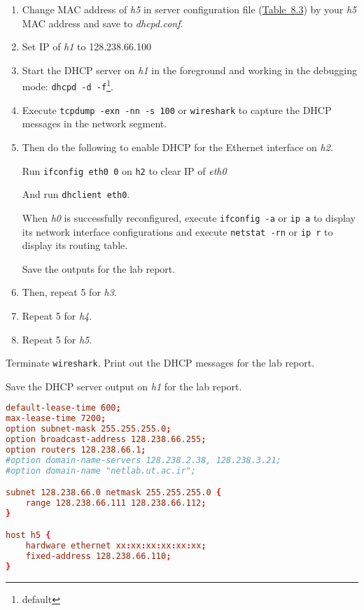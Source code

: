 \documentclass{../UTNetLab}
\begin{document}
    \begin{enumerate}
        \item Change MAC address of \textit{h5} in server configuration file (\hyperref[tab:8.3]{Table~8.3}) by your \textit{h5} MAC address and save to \textit{dhcpd.conf}.
        
        \item Set IP of \textit{h1} to {128.238.66.100}
        
        \item Start the DHCP server on \textit{h1} in the foreground and working in the debugging mode: \lstinline{dhcpd -d -f}\footnote{default }.
        
        \item Execute \lstinline{tcpdump -exn -nn -s 100} or \lstinline{wireshark} to capture the DHCP messages in the network segment.
        
        \item Then do the following to enable DHCP for the Ethernet interface on \textit{h2}.

        Run \lstinline{ifconfig eth0 0} on \lstinline{h2} to clear IP of \textit{eth0}

        And run \lstinline{dhclient eth0}.

        When \textit{h0} is successfully reconfigured, execute \lstinline{ifconfig -a} or \lstinline{ip a} to display its
        network interface configurations and execute \lstinline{netstat -rn} or \lstinline{ip r} to display its routing table.

        Save the outputs for the lab report.
        
        \item Then, repeat 5 for \textit{h3}.
        
        \item Repeat 5 for \textit{h4}.
        
        \item Repeat 5 for \textit{h5}.
    \end{enumerate}

    Terminate \lstinline{wireshark}.
    Print out the DHCP messages for the lab report.

    Save the DHCP server output on \textit{h1} for the lab report.

    \begin{lstlisting}[language={conf}, caption={A DHCP server configuration file (Table~8.3)\label{tab:8.3}},emph={xx}]
default-lease-time 600;
max-lease-time 7200;
option subnet-mask 255.255.255.0;
option broadcast-address 128.238.66.255;
option routers 128.238.66.1;
#option domain-name-servers 128.238.2.38, 128.238.3.21;
#option domain-name "netlab.ut.ac.ir";

subnet 128.238.66.0 netmask 255.255.255.0 {
    range 128.238.66.111 128.238.66.112;
}

host h5 {
    hardware ethernet xx:xx:xx:xx:xx:xx;
    fixed-address 128.238.66.110;
}
    \end{lstlisting}
\end{document}
